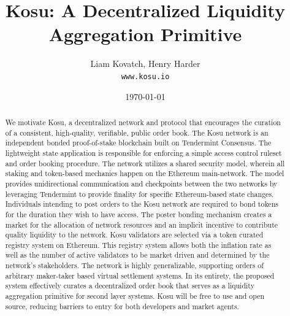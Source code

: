 \documentclass[10pt]{article}
\begin{document}

\title{\textbf{Kosu: A Decentralized Liquidity Aggregation Primitive}} 
\author{Liam Kovatch, Henry Harder \\\texttt{www.kosu.io}}
\date{\today}
\maketitle


\begin{abstract}
  \noindent We motivate Kosu, a decentralized network and protocol that encourages the curation of a consistent, high-quality, verifiable, public order book. The Kosu network is an independent bonded proof-of-stake blockchain built on Tendermint Consensus. The lightweight state application is responsible for enforcing a simple access control ruleset and order booking procedure. The network utilizes a shared security model, wherein all staking and token-based mechanics happen on the Ethereum main-network. The model provides unidirectional communication and checkpoints between the two networks by leveraging Tendermint to provide finality for specific Ethereum-based state changes. Individuals intending to post orders to the Kosu network are required to bond tokens for the duration they wish to have access. The poster bonding mechanism creates a market for the allocation of network resources and an implicit incentive to contribute quality liquidity to the network. Kosu validators are selected via a token curated registry system on Ethereum. This registry system allows both the inflation rate as well as the number of active validators to be market driven and determined by the network’s stakeholders. The network is highly generalizable, supporting orders of arbitrary maker-taker based virtual settlement systems. In its entirety, the proposed system effectively curates a decentralized order book that serves as a liquidity aggregation primitive for second layer systems. Kosu will be free to use and open source, reducing barriers to entry for both developers and market agents.
\end{abstract}
\pagebreak
\end{document}
